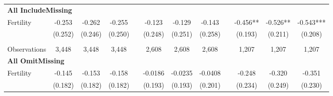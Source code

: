 \begin{landscape}
\begin{table}[htpb!]
\begin{center}
\begin{tabular}{lcccp{2mm}cccp{2mm}ccc}
\multicolumn{12}{l}{\textbf{All IncludeMissing}}\\ 
Fertility&-0.253&-0.262&-0.255&&-0.123&-0.129&-0.143&&-0.456**&-0.526**&-0.543***\\
&(0.252)&(0.246)&(0.250)&&(0.248)&(0.251)&(0.258)&&(0.193)&(0.211)&(0.208)\\
\begin{footnotesize}\end{footnotesize}&\begin{footnotesize}\end{footnotesize}&\begin{footnotesize}\end{footnotesize}&\begin{footnotesize}\end{footnotesize}&\begin{footnotesize}\end{footnotesize}&\begin{footnotesize}\end{footnotesize}&\begin{footnotesize}\end{footnotesize}&\begin{footnotesize}\end{footnotesize}&\begin{footnotesize}\end{footnotesize}&\begin{footnotesize}\end{footnotesize}&\begin{footnotesize}\end{footnotesize}&\begin{footnotesize}\end{footnotesize}\\Observations&3,448&3,448&3,448&&2,608&2,608&2,608&&1,207&1,207&1,207\\
\multicolumn{12}{l}{\textbf{All OmitMissing}}\\ 
Fertility&-0.145&-0.153&-0.158&&-0.0186&-0.0235&-0.0408&&-0.248&-0.320&-0.351\\
&(0.182)&(0.182)&(0.182)&&(0.193)&(0.193)&(0.201)&&(0.234)&(0.249)&(0.230)\\

\end{tabular}
\end{center}
\end{table}
\end{landscape}
